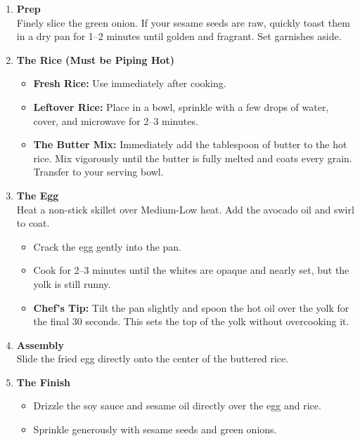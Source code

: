 \begin{enumerate}

    \item \textbf{Prep} \\
          Finely slice the green onion. If your sesame seeds are raw, quickly toast them in a dry pan for 1–2 minutes until golden and fragrant. Set garnishes aside.

    \item \textbf{The Rice (Must be Piping Hot)}
          \begin{itemize}[label=--]
              \item \textbf{Fresh Rice:} Use immediately after cooking.
              \item \textbf{Leftover Rice:} Place in a bowl, sprinkle with a few drops of water, cover, and microwave for 2–3 minutes.
              \item \textbf{The Butter Mix:} Immediately add the tablespoon of butter to the hot rice. Mix vigorously until the butter is fully melted and coats every grain. Transfer to your serving bowl.
          \end{itemize}

    \item \textbf{The Egg} \\
          Heat a non-stick skillet over Medium-Low heat. Add the avocado oil and swirl to coat.
          \begin{itemize}[label=--]
              \item Crack the egg gently into the pan.
              \item Cook for 2–3 minutes until the whites are opaque and nearly set, but the yolk is still runny.
              \item \textbf{Chef’s Tip:} Tilt the pan slightly and spoon the hot oil over the yolk for the final 30 seconds. This sets the top of the yolk without overcooking it.
          \end{itemize}

    \item \textbf{Assembly} \\
          Slide the fried egg directly onto the center of the buttered rice.

    \item \textbf{The Finish}
          \begin{itemize}[label=--]
              \item Drizzle the soy sauce and sesame oil directly over the egg and rice.
              \item Sprinkle generously with sesame seeds and green onions.
          \end{itemize}

\end{enumerate}

